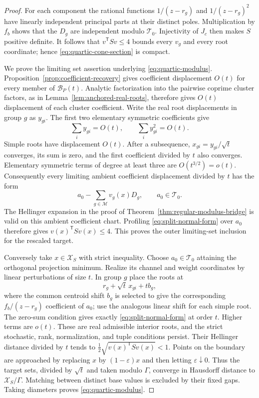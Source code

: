 \begin{proof}
For each component the rational functions
$1/(z-r_g)$ and $1/(z-r_g)^2$ have linearly independent principal
parts at their distinct poles. Multiplication by $f_b$ shows that the
$D_g$ are independent modulo $\mathcal T_0$. Injectivity of $J_c$
then makes $S$ positive definite. It follows that
$v^{\mathsf T}Sv\le4$ bounds every $v_g$ and every root coordinate;
hence \eqref{eq:quartic-cone-section} is compact.

We prove the limiting set assertion underlying
\eqref{eq:quartic-modulus}. Proposition~\ref{prop:coefficient-recovery}
gives coefficient displacement $O(t)$ for every member of
$\mathcal B_P(t)$. Analytic factorization into the pairwise coprime
cluster factors, as in Lemma~\ref{lem:anchored-real-roots}, therefore
gives $O(t)$ displacement of each cluster coefficient. Write the real
root displacements in group $g$ as $y_{gi}$. The first two elementary
symmetric coefficients give
\[
 \sum_i y_{gi}=O(t),\qquad
 \sum_i y_{gi}^2=O(t).
\]
Simple roots have displacement $O(t)$. After a subsequence,
$x_{gi}=y_{gi}/\sqrt t$ converges, its sum is zero, and the first
coefficient divided by $t$ also converges. Elementary symmetric
terms of degree at least three are $O(t^{3/2})=o(t)$. Consequently
every limiting ambient coefficient displacement divided by $t$ has
the form
\begin{equation}\label{eq:split-normal-form}
 a_0-\sum_{g\in\mathcal M}v_g(x)D_g,
                               \qquad a_0\in\mathcal T_0.
\end{equation}
The Hellinger expansion in the proof of
Theorem~\ref{thm:regular-modulus-bridge} is valid on this ambient
coefficient chart. Profiling \eqref{eq:split-normal-form} over $a_0$
therefore gives $v(x)^{\mathsf T}Sv(x)\le4$. This proves the outer
limiting-set inclusion for the rescaled target.

Conversely take $x\in\mathcal X_S$ with strict inequality. Choose
$a_0\in\mathcal T_0$ attaining the orthogonal projection minimum.
Realize its channel and weight coordinates by linear perturbations
of size $t$. In group $g$ place the roots at
\[
 r_g+\sqrt t\,x_{gi}+t b_g,
\]
where the common centroid shift $b_g$ is selected to give the
corresponding $f_b/(z-r_g)$ coefficient of $a_0$; use the analogous
linear shift for each simple root. The zero-sum condition gives
exactly \eqref{eq:split-normal-form} at order $t$. Higher terms are
$o(t)$. These are real admissible interior roots, and the strict
stochastic, rank, normalization, and tuple conditions persist.
Their Hellinger distance divided by $t$ tends to
$\tfrac12\sqrt{v(x)^{\mathsf T}Sv(x)}<1$. Points on the boundary
are approached by replacing $x$ by $(1-\varepsilon)x$ and then
letting $\varepsilon\downarrow0$. Thus the target sets, divided by
$\sqrt t$ and taken modulo $\Gamma$, converge in Hausdorff distance
to $\mathcal X_S/\Gamma$. Matching between distinct base values is
excluded by their fixed gaps. Taking diameters proves
\eqref{eq:quartic-modulus}.


\end{proof}
